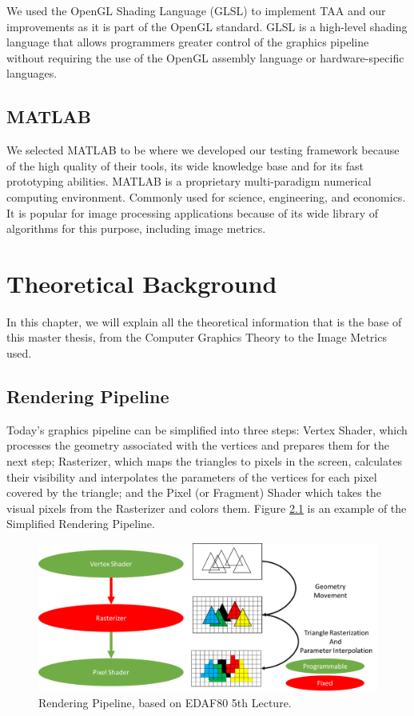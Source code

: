 \documentclass{cslthse-msc}
\begin{document}
We used the OpenGL Shading Language (GLSL) to implement TAA and our improvements as it is part of the OpenGL standard. GLSL is a high-level shading language that allows programmers greater control of the graphics pipeline without requiring the use of the OpenGL assembly language or hardware-specific languages.

\section{MATLAB}
We selected MATLAB to be where we developed our testing framework because of the high quality of their tools, its wide knowledge base and for its fast prototyping abilities.
MATLAB is a proprietary multi-paradigm numerical computing environment. Commonly used for science, engineering, and economics. It is popular for image processing applications because of its wide library of algorithms for this purpose, including image metrics. 

\chapter{Theoretical Background}
In this chapter, we will explain all the theoretical information that is the base of this master thesis, from the Computer Graphics Theory to the Image Metrics used.

\section{Rendering Pipeline}
Today’s graphics pipeline can be simplified into three steps: Vertex Shader, which processes the geometry associated with the vertices and prepares them for the next step; Rasterizer, which maps the triangles to pixels in the screen, calculates their visibility and interpolates the parameters of the vertices for each pixel covered by the triangle; and the Pixel (or Fragment) Shader which takes the visual pixels from the Rasterizer and colors them. Figure \ref{fig:graphpipeline} is an example of the Simplified Rendering Pipeline.

\begin{figure}[!hbt]
	\centering
	\includegraphics[scale=0.7]{images/graphics_pipeline.png} 
	\caption{Rendering Pipeline, based on EDAF80 5th Lecture.~\cite{Doggett2017EDAF80}}\label{fig:graphpipeline}
\end{figure}
\end{document}
